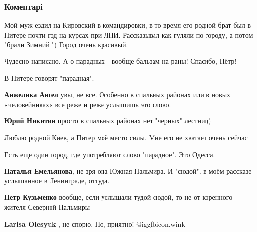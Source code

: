  
 
 
 
 
\subsubsection{Коментарі}
\label{sec:03_11_2021.fb.fb_group.story_kiev_ua.1.kiev_i_piter.cmt}

\begin{itemize} %

Мой муж ездил на Кировский в командировки, в то время его родной брат был в
Питере почти год на курсах при ЛПИ. Рассказывал как гуляли по городу, а потом
"брали Зимний ") Город очень красивый.



Чудесно написано. А о парадных - вообще бальзам на раны! Спасибо, Пётр!

В Питере говорят "парадная".

\begin{itemize} %
\textbf{Анжелика Ангел} увы, не все. Особенно в спальных районах или в новых «человейниках» все реже и реже услышишь это слово.

\textbf{Юрий Никитин} просто в спальных районах нет "черных" лестниц)
\end{itemize} %

Люблю родной Киев, а Питер моё место силы. Мне его не хватает очень сейчас

Есть еще один город, где употребляют слово "парадное". Это Одесса.

\begin{itemize} %
\textbf{Наталья Емельянова}, не зря она Южная Пальмира. И "сюдой", в моём рассказе услышанное в Ленинграде, оттуда.

\textbf{Петр Кузьменко} вообще, если услышали тудой-сюдой, то не от коренного жителя Северной Пальмиры

\textbf{Larisa Olesyuk} , не спорю. Но, приятно! @igg{fbicon.wink} 


\end{itemize}
\end{itemize}
